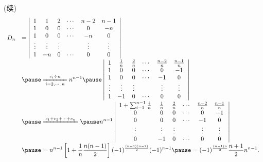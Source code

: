 \begin{frame}
  \begin{small}
    (续)
    $$
    \begin{array}{ll}
      D_n & \disp = \left|
      \begin{array}{cccccc}
        1   &  1 &  2 & \cd &  n-2 & n-1\\
        1   &  0 &  0 & \cd &   0  & -n \\
        1   &  0 &  0 & \cd &  -n  & 0\\
        \vd & \vd & \vd&     & \vd  & \vd \\
        1   & -n &  0 & \cd &   0   & 0
      \end{array}
      \right| \\[1.0cm]
      & \pause \disp \xlongequal[i=2,\cd,n]{c_i\div n} n^{n-1} \pause
      \left|
      \begin{array}{cccccc}
        1   &  \frac 1n & \frac 2n & \cd &  \frac{n-2}n & \frac{n-1}n\\
        1   &  0 &  0 & \cd &   0  & -1 \\
        1   &  0 &  0 & \cd &  -1  & 0\\
        \vd & \vd & \vd&     & \vd  & \vd \\
        1   & -1 &  0 & \cd &   0   & 0
      \end{array}
      \right|\\[1.0cm]
      &\pause \disp \xlongequal{c_1+c_2+\cd+c_n} \pause
      n^{n-1} \left|
      \begin{array}{cccccc}
        1+\sum_{i-1}^{n-1}\frac in   &  \frac 1n & \frac 2n & \cd &  \frac{n-2}n & \frac{n-1}n\\
        0   &  0 &  0 & \cd &   0  & -1 \\
        0   &  0 &  0 & \cd &  -1  & 0\\
        \vd & \vd & \vd&     & \vd  & \vd \\
        0   & -1 &  0 & \cd &   0   & 0
      \end{array}       
      \right|\\[0.8cm]
      & \pause \disp= n^{n-1} \left[ 1 + \frac 1n \frac {n(n-1)}2\right] 
      (-1)^{\frac{(n-1)(n-2)}2}(-1)^{n-1} \pause= (-1)^{\frac{(n-1)n}2} \frac{n+1}2 n^{n-1}.
    \end{array}
    $$

  \end{small}
\end{frame}




